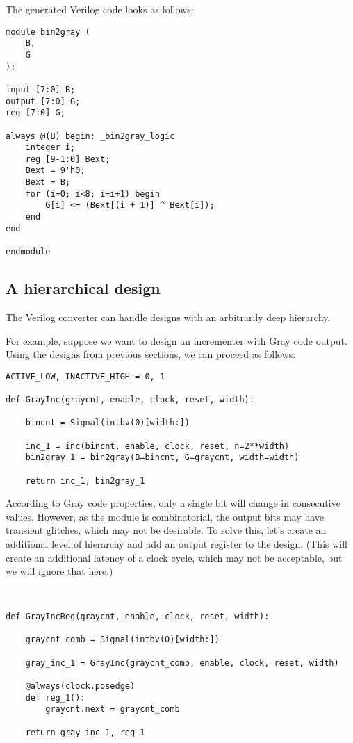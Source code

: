 The generated Verilog code looks as follows:

\begin{verbatim}
module bin2gray (
    B,
    G
);

input [7:0] B;
output [7:0] G;
reg [7:0] G;

always @(B) begin: _bin2gray_logic
    integer i;
    reg [9-1:0] Bext;
    Bext = 9'h0;
    Bext = B;
    for (i=0; i<8; i=i+1) begin
        G[i] <= (Bext[(i + 1)] ^ Bext[i]);
    end
end

endmodule
\end{verbatim}

\subsection{A hierarchical design\label{conv-usage-hier}}
The Verilog converter can handle designs with an
arbitrarily deep hierarchy.

For example, suppose we want to design an
incrementer with Gray code output. Using the
designs from previous sections, we can proceed
as follows:

\begin{verbatim}
ACTIVE_LOW, INACTIVE_HIGH = 0, 1

def GrayInc(graycnt, enable, clock, reset, width):
    
    bincnt = Signal(intbv(0)[width:])
    
    inc_1 = inc(bincnt, enable, clock, reset, n=2**width)
    bin2gray_1 = bin2gray(B=bincnt, G=graycnt, width=width)
    
    return inc_1, bin2gray_1
\end{verbatim}

According to Gray code properties, only a single bit
will change in consecutive values. However, as the
 module is combinatorial, the output bits
may have transient glitches, which may not be desirable.
To solve this, let's create an additional level of
hierarchy and add an output register to the design.
(This will create an additional latency of a clock
cycle, which may not be acceptable, but we will
ignore that here.)

\begin{verbatim}


def GrayIncReg(graycnt, enable, clock, reset, width):
    
    graycnt_comb = Signal(intbv(0)[width:])
    
    gray_inc_1 = GrayInc(graycnt_comb, enable, clock, reset, width)

    @always(clock.posedge)
    def reg_1():
        graycnt.next = graycnt_comb
    
    return gray_inc_1, reg_1
\end{verbatim}

